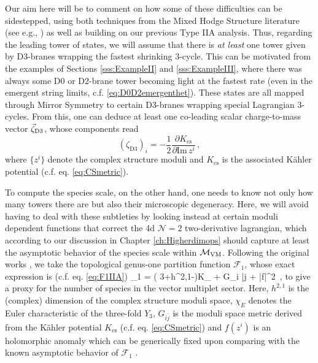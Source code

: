 Our aim here will be to comment on how some of these difficulties can be sidestepped, using both techniques from the Mixed Hodge Structure  literature (see e.g., \cite{Grimm:2018ohb, Grimm:2018cpv}) as well as building on our previous Type IIA analysis. Thus, regarding the leading tower of states, we will assume that there is \emph{at least} one tower given by D3-branes wrapping the fastest shrinking 3-cycle. This can be motivated from the examples of Sections \ref{sss:ExampleII} and \ref{sss:ExampleIII}, where there was always some D0 or D2-brane tower becoming light at the fastest rate (even in the emergent string limits, c.f. \eqref{eq:D0D2emergenthet}). These states are all mapped through Mirror Symmetry to certain D3-branes wrapping special Lagrangian 3-cycles. From this, one can deduce at least one co-leading scalar charge-to-mass vector $\vec{\zeta}_{\rm D3}$, whose components read
%
\begin{equation}
	\left(\zeta_{\text{D3}}\right)_i = - \frac{1}{2} \frac{\partial K_{\text{cs}}}{\partial \text{Im}\, z^i}\, ,
\end{equation}
%
where $\lbrace z^i\rbrace$ denote the complex structure moduli and $K_{\text{cs}}$ is the associated K\"ahler potential (c.f. eq. \eqref{eq:CSmetric}).
	
To compute the species scale, on the other hand, one needs to know not only how many towers there are but also their microscopic degeneracy. Here, we will avoid having to deal with these subtleties by looking instead at certain moduli dependent functions that correct the 4d $\mathcal{N}=2$ two-derivative lagrangian, which according to our discussion in Chapter \ref{ch:Higherdimops} should capture at least the asymptotic behavior of the species scale within ${\cal M}_{\rm VM}$. Following the original works \cite{vandeHeisteeg:2022btw,vandeHeisteeg:2023ubh}, we take the topological genus-one partition function $\mathcal{F}_1$, whose exact expression is (c.f. eq. \eqref{eq:F1IIA})
%
\beq
	_1 =   \left( 3+h^{2,1}-\right)K_{} + \log \det G_{i \bar j} + \log|f|^2\, ,
\label{eq:F1}
\eeq
%    
to give a proxy for the number of species in the vector multiplet sector. Here, $h^{2,1}$ is the (complex) dimension of the complex structure moduli space, $\chi_{E}$ denotes the Euler characteristic of the three-fold $Y_3$, $G_{i \bar j}$ is the moduli space metric derived from the K\"ahler potential $K_{\text{cs}}$ (c.f. eq. \eqref{eq:CSmetric}) and $f(z^i)$ is an holomorphic anomaly which can be generically fixed upon comparing with the known asymptotic behavior of $\mathcal{F}_1$ \cite{Cecotti:1992vy,Bershadsky:1993ta}.
	
